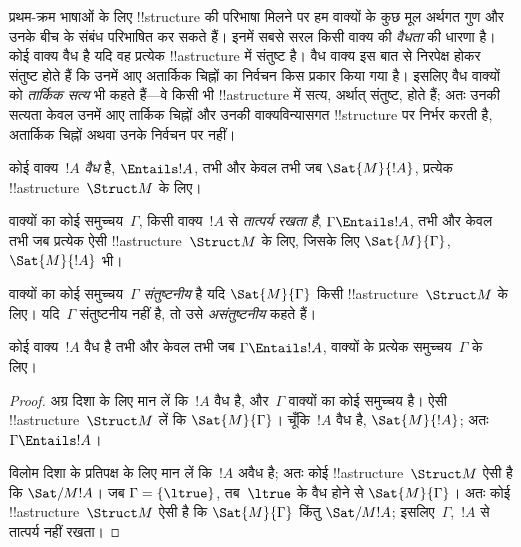 \documentclass[../../../include/open-logic-section]{subfiles}
\begin{document}

\begin{explain}
प्रथम-क्रम भाषाओं के लिए !!{structure} की परिभाषा मिलने पर हम वाक्यों के
कुछ मूल अर्थगत गुण और उनके बीच के संबंध परिभाषित कर सकते हैं। इनमें सबसे
सरल किसी वाक्य की \emph{वैधता} की धारणा है। कोई वाक्य वैध है यदि वह प्रत्येक
!!a{structure} में संतुष्ट है। वैध वाक्य इस बात से निरपेक्ष होकर संतुष्ट
होते हैं कि उनमें आए अतार्किक चिह्नों का निर्वचन किस प्रकार किया गया है।
इसलिए वैध वाक्यों को \emph{तार्किक सत्य} भी कहते हैं---वे किसी भी
!!a{structure} में सत्य, अर्थात् संतुष्ट, होते हैं; अतः उनकी सत्यता केवल
उनमें आए तार्किक चिह्नों और उनकी वाक्यविन्यासगत !!{structure} पर निर्भर करती
है, अतार्किक चिह्नों अथवा उनके निर्वचन पर नहीं।
\end{explain}

\begin{defn}[वैधता]
कोई वाक्य~$!A$ \emph{वैध} है, $\Entails !A$, तभी और केवल तभी जब
$\Sat{M}{!A}$, प्रत्येक !!a{structure}~$\Struct M$ के लिए।
\end{defn}

\begin{defn}[तात्पर्य]
वाक्यों का कोई समुच्चय~$\Gamma$, किसी वाक्य~$!A$ से \emph{तात्पर्य रखता
है}, $\Gamma
\Entails !A$, तभी और केवल तभी जब प्रत्येक ऐसी
!!a{structure}~$\Struct M$ के लिए, जिसके लिए $\Sat{M}{\Gamma}$,
$\Sat{M}{!A}$ भी।
\end{defn}


\begin{defn}[संतुष्टनीयता]
वाक्यों का कोई समुच्चय~$\Gamma$ \emph{संतुष्टनीय} है यदि $\Sat{M}{\Gamma}$
किसी !!a{structure}~$\Struct M$ के लिए। यदि~$\Gamma$
संतुष्टनीय नहीं है, तो उसे \emph{असंतुष्टनीय} कहते हैं।
\end{defn}

\begin{prop}
कोई वाक्य~$!A$ वैध है तभी और केवल तभी जब $\Gamma \Entails !A$,
वाक्यों के प्रत्येक समुच्चय~$\Gamma$ के लिए।
\end{prop}

\begin{proof}
अग्र दिशा के लिए मान लें कि~$!A$ वैध है, और~$\Gamma$ वाक्यों का कोई
समुच्चय है। ऐसी !!a{structure}~$\Struct M$ लें कि $\Sat{M}{\Gamma}$।
चूँकि~$!A$ वैध है, $\Sat{M}{!A}$; अतः $\Gamma
\Entails !A$।

विलोम दिशा के प्रतिपक्ष के लिए मान लें कि~$!A$ अवैध है; अतः कोई
!!a{structure}~$\Struct M$ ऐसी है कि $\Sat/{M}{!A}$। जब $\Gamma
= \{ \ltrue \}$, तब~$\ltrue$ के वैध होने से $\Sat{M}{\Gamma}$। अतः कोई
!!a{structure}~$\Struct M$ ऐसी है कि $\Sat{M}{\Gamma}$ किंतु
$\Sat/{M}{!A}$; इसलिए~$\Gamma$,~$!A$ से तात्पर्य नहीं रखता।
\end{proof}
\end{document}
